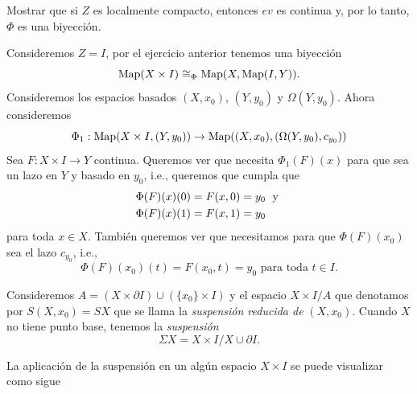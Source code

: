 \begin{ejercicio}
    Mostrar que si $Z$ es localmente compacto, entonces $ev$ es continua y, por lo tanto, $\Phi$ es una biyección.
\end{ejercicio}
Consideremos $Z=I$, por el ejercicio anterior tenemos una biyección 
\begin{equation*}
    \mathrm{Map}(X\times I)\cong_{\Phi}\mathrm{Map}(X,\mathrm{Map}(I,Y)).
\end{equation*}
Consideremos los espacios basados $(X,x_0)$, $(Y,y_0)$ y $\Omega(Y,y_0)$. Ahora consideremos 
\begin{equation*}
    \Phi_1:\mathrm{Map}(X\times I,(Y,y_0))\to \mathrm{Map}((X,x_0),(\Omega(Y,y_0),c_{y_0}))
\end{equation*}
Sea $F:X\times I\to Y$ continua. Queremos ver que necesita $\Phi_1(F)(x)$ para que sea un lazo en $Y$ y basado en $y_0$, i.e., queremos que cumpla que
\begin{align*}
    \Phi(F)(x)(0)&=F(x,0)=y_0\text{ \;y }\\
    \Phi(F)(x)(1)&=F(x,1)=y_0
\end{align*}
para toda $x\in X$. También queremos ver que necesitamos para que $\Phi(F)(x_0)$ sea el lazo $c_{y_0}$, i.e.,
\begin{equation*}
    \Phi(F)(x_0)(t)=F(x_0,t)=y_0 \text{ para toda } t\in I.
\end{equation*}

Consideremos $A=(X\times\partial I)\cup (\{x_0\}\times I)$ y el espacio $X\times I/A$ que denotamos por $S(X,x_0)=SX$ que se llama la \textit{suspensión reducida de} $(X,x_0)$. Cuando $X$ no tiene punto base, tenemos la \textit{suspensión}
\[
\Sigma X=X\times I/X\cup\partial I.
\]

 La aplicación de la suspensión en un algún espacio $X\times I$ se puede visualizar como sigue 

